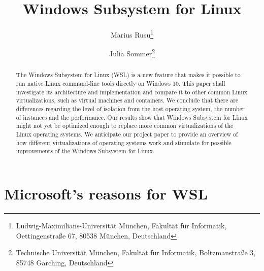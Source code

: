 \documentclass[utf8,biblatex, ngerman, english]{lni}
\begin{document}
\title[WSL]{Windows Subsystem for Linux}
\author[Marius Rusu \and Julia Sommer]
{Marius Rusu\footnote{Ludwig-Maximilians-Universität München, Fakultät für Informatik, Oettingenstraße 67, 80538 München, Deutschland } \and
 Julia Sommer\footnote{Technische Universität München, Fakultät für Informatik, Boltzmanstraße 3, 85748 Garching, Deutschland }}
\maketitle

\begin{abstract}
The Windows Subsystem for Linux (WSL) is a new feature that makes it possible to run native Linux command-line tools directly on Windows 10. This paper shall investigate its architecture and implementation and compare it to other common Linux virtualizations, such as virtual machines and containers. We conclude that there are differences regarding the level of isolation from the host operating system, the number of instances and the performance. Our results show that Windows Subsystem for Linux might not yet be optimized enough to replace more common virtualizations of the Linux operating systems. We anticipate our project paper to provide an overview of how different virtualizations of operating systems work and stimulate for possible improvements of the Windows Subsystem for Linux. 
\end{abstract}


\section{Microsoft's reasons for WSL}
\end{document}
